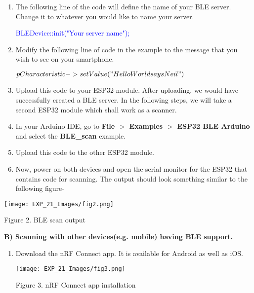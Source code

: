 \documentclass[12pt,a4paper]{article}
\begin{document}
\begin{sloppypar}
\begin{justify}
\begin{enumerate}
\item The following line of the code will define the name of your BLE server. Change it to whatever you would like to name your server.
\begin{center} \textcolor{blue}{ BLEDevice::init("Your server name");} \end {center} 

\item  Modify the following line of code in the example to the message that you wish to see on your smartphone.
\begin{center} 
\textcolor{blue}{$pCharacteristic->setValue("Hello World says Neil")$}
\end{center}

\item Upload this code to your ESP32 module. After uploading, we would have successfully created a BLE server. In the following steps, we will take a second ESP32 module which shall work as a scanner.

\item In your Arduino IDE, go to \textbf{File $>$ Examples $>$ ESP32 BLE Arduino} and select the \textbf{BLE\_scan} example.
\item Upload this code to the other ESP32 module.
\item Now, power on both devices and open the serial monitor for the ESP32 that contains code for scanning. The output should look something similar to the following figure-
\end{enumerate}

\begin{center} 
\texttt{[image: EXP\_21\_Images/fig2.png]}
\end{center}
\begin{center} {Figure 2. BLE scan output}\end{center}

\noindent \textbf{B) Scanning with other devices(e.g. mobile) having BLE support.}
\vspace{-3mm}
\begin{enumerate}
\setlength\itemsep{-0.3em}
\item Download the nRF Connect app. It is available for Android as well as iOS. 

\begin{center} 
\texttt{[image: EXP\_21\_Images/fig3.png]}
\end{center}
\begin{center} {Figure 3. nRF Connect app installation}\end{center}


\end{enumerate}
\end{justify}
\end{sloppypar}
\end{document}
